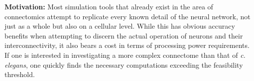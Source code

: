 \documentclass[a4paper,11pt]{article}
\begin{document}


\textbf{Motivation:}
Most simulation tools that already exist in the area of connectomics attempt to replicate every known detail of the neural network, not just as a whole but also on a cellular level. While this has obvious accuracy benefits when attempting to discern the actual operation of neurons and their interconnectivity, it also bears a cost in terms of processing power requirements. If one is interested in investigating a more complex connectome than that of \emph{c. elegans}, one quickly finds the necessary computations exceeding the feasibility threshold.
\end{document}
